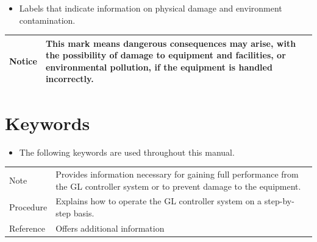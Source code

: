\begin{itemize}
\tightlist
\item
  Labels that indicate information on physical damage and environment
  contamination.
\end{itemize}

\begin{longtable}[]{@{}ll@{}}
\toprule
\endhead
\begin{minipage}[t]{0.28\columnwidth}\raggedright
Notice\strut
\end{minipage} & \begin{minipage}[t]{0.66\columnwidth}\raggedright
This mark means dangerous consequences may arise, with the possibility
of damage to equipment and facilities, or environmental pollution, if
the equipment is handled incorrectly.\strut
\end{minipage}\tabularnewline
\bottomrule
\end{longtable}


\section{Keywords}

\begin{itemize}
\tightlist
\item
  The following keywords are used throughout this manual.
\end{itemize}

\begin{longtable}[]{@{}ll@{}}
\toprule
\endhead
\begin{minipage}[t]{0.28\columnwidth}\raggedright
Note\strut
\end{minipage} & \begin{minipage}[t]{0.66\columnwidth}\raggedright
Provides information necessary for gaining full performance from the GL
controller system or to prevent damage to the equipment.\strut
\end{minipage}\tabularnewline
\begin{minipage}[t]{0.28\columnwidth}\raggedright
Procedure\strut
\end{minipage} & \begin{minipage}[t]{0.66\columnwidth}\raggedright
Explains how to operate the GL controller system on a step-by-step
basis.\strut
\end{minipage}\tabularnewline
\begin{minipage}[t]{0.28\columnwidth}\raggedright
Reference\strut
\end{minipage} & \begin{minipage}[t]{0.66\columnwidth}\raggedright
Offers additional information\strut
\end{minipage}\tabularnewline
\bottomrule
\end{longtable}

